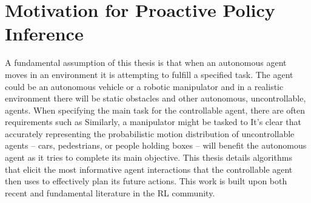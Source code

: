 %
%
\chapter{Motivation for Proactive Policy Inference}\label{chapt:motivation}

%
%
%
%

    A fundamental assumption of this thesis is that when an autonomous agent moves in an environment it is attempting to
    fulfill a specified task. The agent could be an autonomous vehicle or a robotic manipulator and in a realistic
    environment there will be static obstacles and other autonomous, uncontrollable, agents. When specifying the main
    task for the controllable agent, there are often requirements such as  Similarly, a manipulator might be tasked
    to  It's clear that
    accurately representing the probabilistic motion distribution of uncontrollable agents -- cars, pedestrians, or people holding boxes -- will
    benefit the autonomous agent as it tries to complete its main objective. This thesis details algorithms that elicit
    the most informative agent interactions that the controllable agent then uses to effectively plan its future
    actions. This work is built upon both recent and fundamental literature in the \ac{RL} community.

